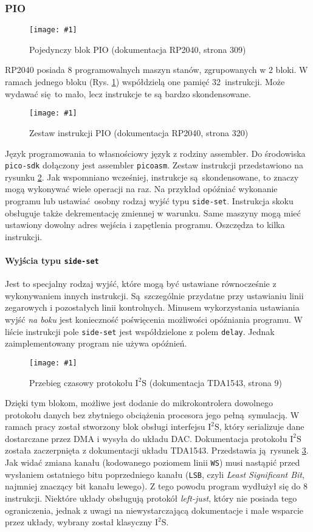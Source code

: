 \documentclass[polish]{aghengthesis}
\newcommand{\imgint}[4]{
	\begin{figure}[{#4}]
		\centering
		\texttt{[image: \#1]}
		\caption{#2}
		\label{#1}
	\end{figure}
}
\newcommand{\imgh}[3]{\imgint{#1}{#2}{#3}{H}}
\newcommand{\isqs}{$\text{I}^{2}\text{S}$}
\newcommand{\sset}{\lstinline|side-set|}
\begin{document}
			\subsubsection{PIO}
				\imgh{3/pio_block}{Pojedynczy blok PIO (dokumentacja RP2040\textsuperscript{\cite{pico_pdf}}, strona 309)}{0.7}
				
				RP2040 posiada 8 programowalnych maszyn stanów, zgrupowanych w 2 bloki. W ramach jednego bloku (Rys. \ref{3/pio_block}) współdzielą one pamięć 32 instrukcji. Może wydawać się to mało, lecz instrukcje te są bardzo skondensowane.
				
				\imgh{3/pio_instr}{Zestaw instrukcji PIO (dokumentacja RP2040, strona 320)}{0.7}
				Język programowania to własnościowy język z rodziny assembler. Do środowiska \lstinline|pico-sdk| dołączony jest assembler \lstinline|picoasm|. Zestaw instrukcji przedstawiono na rysunku \ref{3/pio_instr}. Jak wspomniano wcześniej, instrukcje są skondensowane, to znaczy mogą wykonywać wiele operacji na raz. Na przykład opóźniać wykonanie programu lub ustawiać osobny rodzaj wyjść typu \sset{}.
				Instrukcja skoku obsługuje także dekrementację zmiennej w warunku. Same maszyny mogą mieć ustawiony dowolny adres wejścia i zapętlenia programu. Oszczędza to kilka instrukcji.
				
				\paragraph{Wyjścia typu \sset{}}
					Jest to specjalny rodzaj wyjść, które mogą być ustawiane równocześnie z wykonywaniem innych instrukcji. Są szczególnie przydatne przy ustawianiu linii zegarowych i pozostałych linii kontrolnych. Minusem wykorzystania ustawiania wyjść \textit{na boku} jest konieczność poświęcenia możliwości opóźniania programu. W liście instrukcji pole \sset{} jest współdzielone z polem \lstinline|delay|. Jednak zaimplementowany program nie używa opóźnień.
				
				\imgh{3/pio_i2s_docs}{Przebieg czasowy protokołu \isqs{} (dokumentacja TDA1543\textsuperscript{\cite{tda_pdf}}, strona 9)}{0.9}
				Dzięki tym blokom, możliwe jest dodanie do mikrokontrolera dowolnego protokołu danych bez zbytniego obciążenia procesora jego pełną symulacją. W ramach pracy został stworzony blok obsługi interfejsu \isqs{}, który serializuje dane dostarczane przez DMA i wysyła do układu DAC.
				Dokumentacja protokołu \isqs{} została zaczerpnięta z dokumentacji układu TDA1543. Przedstawia ją rysunek \ref{3/pio_i2s_docs}. Jak widać zmiana kanału (kodowanego poziomem linii \lstinline|WS|)  musi nastąpić przed wysłaniem ostatniego bitu poprzedniego kanału (\lstinline|LSB|, czyli \textit{Least Significant Bit}, najmniej znaczący bit kanału lewego). Z tego powodu program wydłużył się do 8 instrukcji. Niektóre układy obsługują protokół \textit{left-just}, który nie posiada tego ograniczenia, jednak z uwagi na niewystarczającą dokumentacje i małe wsparcie przez układy, wybrany został klasyczny \isqs{}.
				
\end{document}
